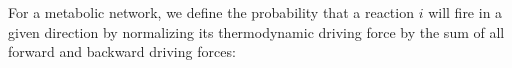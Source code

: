 For a metabolic network, we define the probability that a reaction $i$ will fire in a given direction by normalizing its thermodynamic driving force by the sum of all forward and backward driving forces: